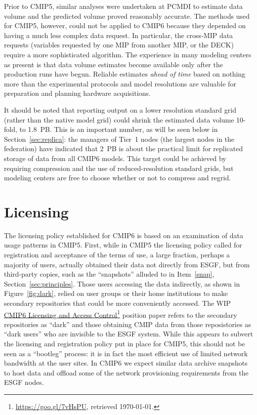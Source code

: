 \documentclass[gmd,manuscript]{copernicus}
\newcommand{\pllabel}[1]{\label{p-#1}\linelabel{l-#1}}
\newcommand{\urlref}[2] {\href{#1}{#2}\footnote{\url{#1}, retrieved \today.}}
\begin{document}
Prior to CMIP5, similar analyses were undertaken at PCMDI to estimate data
volume and the predicted volume proved reasonably accurate. 
The methods used for CMIP5, however, could not be applied to CMIP6 because 
they depended on having a much less complex data request.  
\pllabel{RC1-26}
In particular, the cross-MIP data requests (variables requested by one
MIP from another MIP, or the DECK) require a more sophisticated
algorithm. The experience in many
modeling centers as present is that data volume estimates become
available only after the production runs have begun. Reliable estimates
\emph{ahead of time} based on nothing more than the experimental
protocols and model resolutions are valuable for preparation and planning
hardware acquisitions.

It should be noted that reporting output on a lower resolution
standard grid (rather than the native model grid) could shrink the estimated
data volume 10-fold, to 1.8~PB. This is an important number, as will be
seen below in Section~\ref{sec:replica}: the managers of Tier~1 nodes
\pllabel{RC3-18}
(the largest nodes in the federation) have indicated that 2~PB is
about the practical limit for replicated storage of  data from
all CMIP6 models.
This target could be achieved by requiring compression and the use of 
reduced-resolution standard grids, but
modeling centers are free to choose
whether or not to compress and regrid.

\section{Licensing}
\label{sec:licensing}

The licensing policy established for CMIP6 is based on an examination of
data usage patterns in CMIP5. First, while in CMIP5 the licensing policy called
for registration and acceptance of the terms of use, a large fraction,
perhaps a majority of users, actually obtained their data not directly
from ESGF, but from
\pllabel{RC1-33}
third-party copies, such as the ``snapshots'' alluded to in
Item~\ref{snap}, Section~\ref{sec:principles}. Those users accessing
the data indirectly, as shown in Figure~\ref{fig:dark}, relied on user
groups or their home institutions to make secondary repositories that
could be more conveniently accessed. The WIP
\urlref{https://goo.gl/7vHsPU}{CMIP6 Licensing and Access Control}
position paper refers to the secondary repositories as ``dark'' and
those obtaining CMIP data from those reposistories as ``dark users''
who are invisible to the ESGF system. While this appears to subvert
the licensing and registration policy put in place for CMIP5, this
should not be seen as a ``bootleg'' process: it is in fact the most
efficient use of limited network bandwidth at the user sites.
\pllabel{RC2-29}
In CMIP6 we expect similar data archive snapshots to host data and offload some of the
network provisioning requirements from the ESGF nodes.
\end{document}
